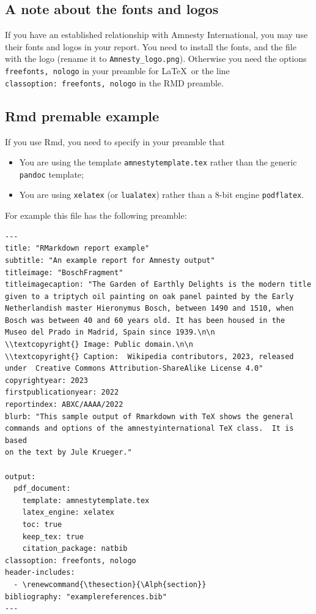 \documentclass[
  freefonts, nologo]{amnestyreport}
\renewcommand{\thesection}{\Alph{section}}
\begin{document}
\subsection*{A note about the fonts and
logos}\label{a-note-about-the-fonts-and-logos}

If you have an established relationship with Amnesty International, you
may use their fonts and logos in your report. You need to install the
fonts, and the file with the logo (rename it to
\texttt{Amnesty\_logo.png}). Otherwise you need the options
\texttt{freefonts,\ nologo} in your preamble for \LaTeX~or the line
\texttt{classoption:\ freefonts,\ nologo} in the RMD preamble.

\subsection*{Rmd premable example}\label{rmd-premable-example}

If you use Rmd, you need to specify in your preamble that

\begin{itemize}
\tightlist
\item
  You are using the template \texttt{amnestytemplate.tex} rather than
  the generic \texttt{pandoc} template;
\item
  You are using \texttt{xelatex} (or \texttt{lualatex}) rather than a
  8-bit engine \texttt{podflatex}.
\end{itemize}

For example this file has the following preamble:

\begin{verbatim}
---
title: "RMarkdown report example"
subtitle: "An example report for Amnesty output"
titleimage: "BoschFragment"
titleimagecaption: "The Garden of Earthly Delights is the modern title
given to a triptych oil painting on oak panel painted by the Early
Netherlandish master Hieronymus Bosch, between 1490 and 1510, when
Bosch was between 40 and 60 years old. It has been housed in the
Museo del Prado in Madrid, Spain since 1939.\n\n
\\textcopyright{} Image: Public domain.\n\n
\\textcopyright{} Caption:  Wikipedia contributors, 2023, released
under  Creative Commons Attribution-ShareAlike License 4.0"
copyrightyear: 2023
firstpublicationyear: 2022
reportindex: ABXC/AAAA/2022
blurb: "This sample output of Rmarkdown with TeX shows the general
commands and options of the amnestyinternational TeX class.  It is based
on the text by Jule Krueger."

output: 
  pdf_document:
    template: amnestytemplate.tex
    latex_engine: xelatex
    toc: true
    keep_tex: true
    citation_package: natbib
classoption: freefonts, nologo
header-includes:
  - \renewcommand{\thesection}{\Alph{section}}
bibliography: "examplereferences.bib"
---
\end{verbatim}
\end{document}
